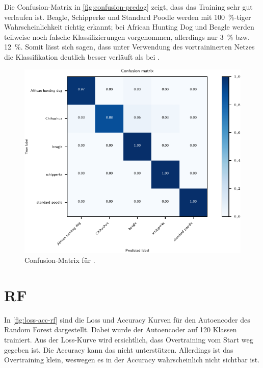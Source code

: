 Die Confusion-Matrix in \autoref{fig:confusion-predog} zeigt, dass das Training sehr gut
verlaufen ist. Beagle, Schipperke und Standard Poodle werden mit \SI{100}{\percent}-tiger
Wahrscheinlichkeit richtig erkannt; bei African Hunting Dog und Beagle werden teilweise
noch falsche Klassifizierungen vorgenommen, allerdings nur \SI{3}{\percent} bzw.
\SI{12}{\percent}. Somit lässt sich sagen, dass unter Verwendung des vortraininerten
Netzes die Klassifikation deutlich besser verläuft als bei \MiniDog.

\begin{figure}
  \centering
  \includegraphics[scale=0.8]{pics/ergebnisse/PreDogNN/confusion_matrix.pdf}
  \caption{Confusion-Matrix für \PreDog.}
  \label{fig:confusion-predog}
\end{figure}

\section{RF}

In \autoref{fig:loss-acc-rf} sind die Loss und Accuracy Kurven für den Autoencoder
des Random Forest dargestellt. Dabei wurde der Autoencoder auf 120 Klassen trainiert.
Aus der Loss-Kurve wird ersichtlich, dass Overtraining vom Start weg gegeben ist.
Die Accuracy kann das nicht unterstützen. Allerdings ist das Overtraining klein,
weswegen es in der Accuracy wahrscheinlich nicht sichtbar ist.

